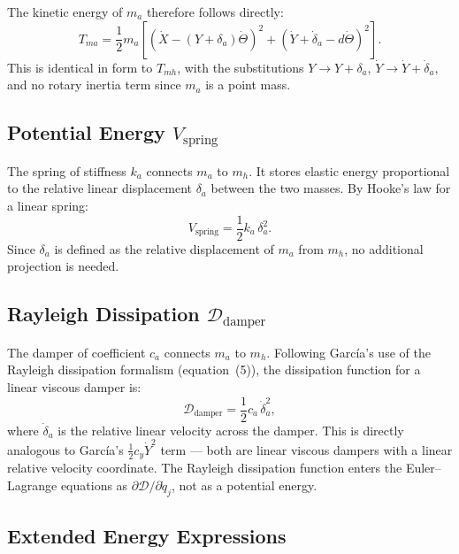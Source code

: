\documentclass{article}
\begin{document}
%
The kinetic energy of $m_a$ therefore follows directly:
%
\begin{equation}
    T_{ma} = \frac{1}{2}m_a\left[
        \left(\dot{X} - (Y+\delta_a)\dot{\Theta}\right)^2
        + \left(\dot{Y} + \dot{\delta}_a - d\dot{\Theta}\right)^2
    \right].
\end{equation}
%
This is identical in form to $T_{mh}$, with the substitutions
$Y \to Y + \delta_a$, $\dot{Y} \to \dot{Y} + \dot{\delta}_a$,
and no rotary inertia term since $m_a$ is a point mass.

\subsection*{Potential Energy $V_\text{spring}$}

The spring of stiffness $k_a$ connects $m_a$ to $m_h$. It stores elastic
energy proportional to the relative linear displacement $\delta_a$ between
the two masses. By Hooke's law for a linear spring:
%
\begin{equation}
    V_\text{spring} = \frac{1}{2}k_a\,\delta_a^2.
\end{equation}
%
Since $\delta_a$ is defined as the relative displacement of $m_a$ from $m_h$,
no additional projection is needed.

\subsection*{Rayleigh Dissipation $\mathcal{D}_\text{damper}$}

The damper of coefficient $c_a$ connects $m_a$ to $m_h$. Following
Garc\'ia's use of the Rayleigh dissipation formalism (equation~(5)), the
dissipation function for a linear viscous damper is:
%
\begin{equation}
    \mathcal{D}_\text{damper} = \frac{1}{2}c_a\,\dot{\delta}_a^2,
\end{equation}
%
where $\dot{\delta}_a$ is the relative linear velocity across the damper.
This is directly analogous to Garc\'ia's $\frac{1}{2}c_y\dot{Y}^2$ term ---
both are linear viscous dampers with a linear relative velocity coordinate.
The Rayleigh dissipation function enters the Euler--Lagrange equations as
$\partial\mathcal{D}/\partial\dot{q}_j$, not as a potential energy.

\subsection*{Extended Energy Expressions}
\end{document}

